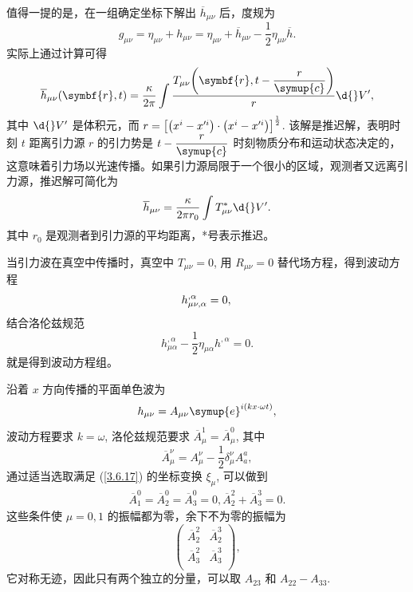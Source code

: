 \documentclass[UTF8, 12pt, a4paper, oneside, onecolumn, fontset=none]{ctexart}
\begin{document}
值得一提的是，在一组确定坐标下解出 $\overline{h}_{\mu\nu}$ 后，度规为
\begin{equation}
g_{\mu\nu}=\eta_{\mu\nu}+h_{\mu\nu}=\eta_{\mu\nu}+\overline{h}_{\mu\nu}-\frac{1}{2}\eta_{\mu\nu}\overline{h}.
\end{equation}
实际上通过计算可得
\begin{equation}
\overline{h}_{\mu\nu}\mleft(\symbf{r}, t\mright)=\frac{\kappa}{2\pi}\int\frac{T_{\mu\nu}\mleft(\symbf{r}, t-\dfrac{r}{\symup{c}}\mright)}{r}\d{}V',
\end{equation}
其中 $\d{}V'$ 是体积元，而 $r=\mleft[\mleft(x^{i}-x'^{i}\mright)\cdot\mleft(x^{i}-x'^{i}\mright)\mright]^{\frac{1}{2}}$. 该解是推迟解，表明时刻 $t$ 距离引力源 $r$ 的引力势是 $t-\dfrac{r}{\symup{c}}$ 时刻物质分布和运动状态决定的，这意味着引力场以光速传播。如果引力源局限于一个很小的区域，观测者又远离引力源，推迟解可简化为
\begin{equation}
\overline{h}_{\mu\nu}=\frac{\kappa}{2\pi r_{0}}\int T_{\mu\nu}^{*}\d{}V'.
\end{equation}
其中 $r_{0}$ 是观测者到引力源的平均距离，*号表示推迟。

当引力波在真空中传播时，真空中 $T_{\mu\nu}=0$, 用 $R_{\mu\nu}=0$ 替代场方程，得到波动方程
\begin{equation}
h^{,\alpha}_{\mu\nu,\alpha}=0,\\
\end{equation}
结合洛伦兹规范
\begin{equation}
h^{,\alpha}_{\mu\alpha}-\frac{1}{2}\eta_{\mu\alpha}h^{,\alpha}=0.
\end{equation}
就是得到波动方程组。

沿着 $x$ 方向传播的平面单色波为
\begin{equation}
h_{\mu\nu}=A_{\mu\nu}\symup{e}^{i\mleft(kx\cdot\omega t\mright)},
\end{equation}
波动方程要求 $k=\omega$, 洛伦兹规范要求 $\overline{A}^{1}_{\mu}=\overline{A}^{0}_{\mu}$, 其中
\begin{equation}
\overline{A}^{\nu}_{\mu}=A^{\nu}_{\mu}-\frac{1}{2}\delta^{\nu}_{\mu}A^{a}_{a},
\end{equation}
通过适当选取满足 (\ref{3.6.17}) 的坐标变换 $\xi_{\mu}$, 可以做到
\begin{align}
\overline{A}^{0}_{1}=\overline{A}^{0}_{2}=\overline{A}^{0}_{3}=0,\overline{A}^{2}_{2}+\overline{A}^{3}_{3}=0.
\end{align}
这些条件使 $\mu=0, 1$ 的振幅都为零，余下不为零的振幅为
\begin{equation}
\begin{pmatrix}
\overline{A}^{2}_{2} & \overline{A}^{3}_{2}\\
\overline{A}^{2}_{3} & \overline{A}^{3}_{3}\\
\end{pmatrix},
\end{equation}
它对称无迹，因此只有两个独立的分量，可以取 $A_{23}$ 和 $A_{22}-A_{33}$.
\end{document}
